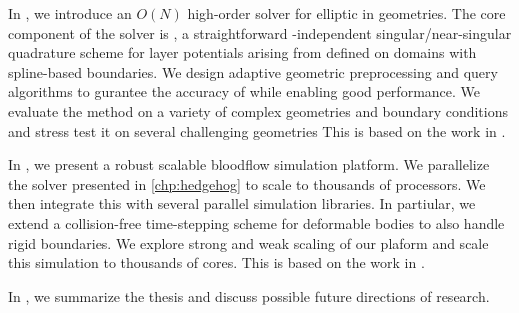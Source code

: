 In , we introduce an $O(N)$ high-order solver for elliptic \pdes in \threed geometries.
The core component of the solver is \qbkix, a straightforward \pde-independent singular/near-singular quadrature scheme for layer potentials arising from \pdes defined on domains with spline-based boundaries.
We design adaptive geometric preprocessing and query algorithms to gurantee the accuracy of \qbkix while enabling good performance. 
We evaluate the method on a variety of complex geometries and boundary conditions and stress test it on several challenging geometries
This is based on the work in \cite{morse2020robust}.

In , we present a robust scalable bloodflow simulation platform. 
We parallelize the \pde solver presented in \cref{chp:hedgehog} to scale to thousands of processors.
We then integrate this with several parallel \rbc simulation libraries. 
In partiular, we extend a collision-free time-stepping scheme for deformable bodies to also handle rigid boundaries.
We explore strong and weak scaling of our plaform and scale this simulation to thousands of cores.
This is based on the work in \cite{lu2019scalable}.

In , we summarize the thesis and discuss possible future directions of research.
